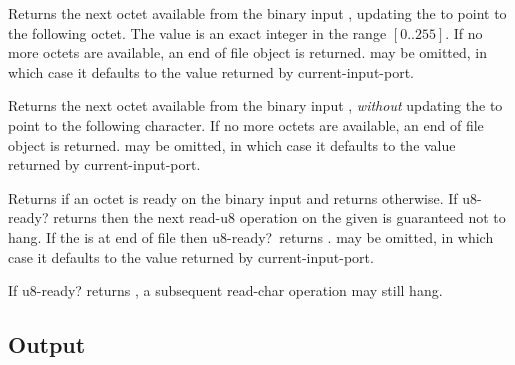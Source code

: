 \begin{entry}{%
}

Returns the next octet available from the binary input ,
updating the  to point to the following octet.  The value is
an exact integer in the range $[0..255]$.  If no more octets are
available, an end of file object is returned.   may be
omitted, in which case it defaults to the value returned by {\cf
  current-input-port}.

\end{entry}


\begin{entry}{%
}

Returns the next octet available from the binary input ,
{\em without} updating the  to point to the following
character.  If no more octets are available, an end of file object is
returned.   may be omitted, in which case it defaults to the
value returned by {\cf current-input-port}.

\end{entry}


\begin{entry}{%
}

Returns \schtrue{} if an octet is ready on the binary input 
and returns \schfalse{} otherwise.  If {\cf u8-ready?} returns
\schtrue{} then the next {\cf read-u8} operation on the given
 is guaranteed not to hang.  If the  is at end of
file then {\cf u8-ready?}\ returns \schtrue.   may be
omitted, in which case it defaults to the value returned by {\cf
  current-input-port}.

\begin{note}
If {\cf u8-ready?} returns \schtrue{}, a subsequent {\cf read-char}
operation may still hang.
\end{note}
\end{entry}

\subsection{Output}
\label{outputsection}

\noindent \hbox{}
\vspace{-5ex}

